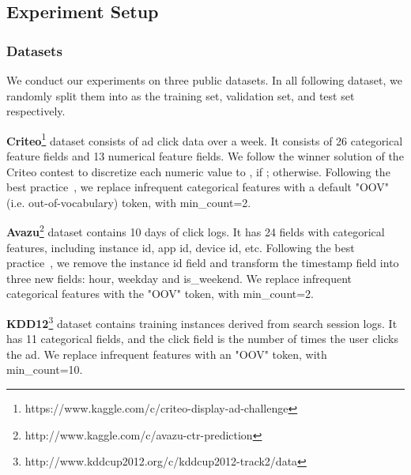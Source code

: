\documentclass[sigconf]{acmart}
\begin{document}
\subsection{Experiment Setup}
\subsubsection{Datasets}

We conduct our experiments on three public datasets. In all following dataset, we randomly split them into  as the training set, validation set, and test set respectively. 


\textbf{Criteo}\footnote{https://www.kaggle.com/c/criteo-display-ad-challenge} dataset consists of ad click data over a week. It consists of 26 categorical feature fields and 13 numerical feature fields. We follow the winner solution of the Criteo contest to discretize each numeric value  to , if ;  otherwise. Following the best practice~\cite{fuxictr}, we replace infrequent categorical features with a default "OOV" (i.e. out-of-vocabulary) token, with min\_count=2.

\textbf{Avazu}\footnote{http://www.kaggle.com/c/avazu-ctr-prediction} dataset contains 10 days of click logs. It has 24 fields with categorical features, including instance id, app id, device id, etc. Following the best practice~\cite{fuxictr}, we remove the instance id field and transform the timestamp field into three new fields: hour, weekday and is\_weekend. We replace infrequent categorical features with the "OOV" token, with min\_count=2.

\textbf{KDD12}\footnote{http://www.kddcup2012.org/c/kddcup2012-track2/data} dataset contains training instances derived from search session logs. It has 11 categorical fields, and the click field is the number of times the user clicks the ad. We replace infrequent features with an "OOV" token, with min\_count=10.
\end{document}
